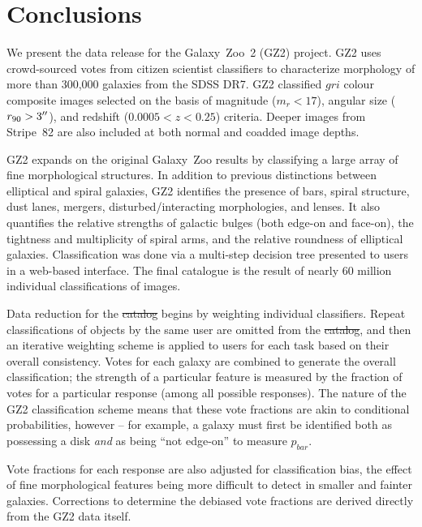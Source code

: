 \documentclass[useAMS,usenatbib]{mn2e}
\providecommand{\DIFaddtex}[1]{{\protect\color{blue}\uwave{#1}}} %
\providecommand{\DIFdeltex}[1]{{\protect\color{red}\sout{#1}}}                      %
\providecommand{\DIFaddbegin}{} %
\providecommand{\DIFaddend}{} %
\providecommand{\DIFdelbegin}{} %
\providecommand{\DIFdelend}{} %
\providecommand{\DIFadd}[1]{\texorpdfstring{\DIFaddtex{#1}}{#1}} %
\providecommand{\DIFdel}[1]{\texorpdfstring{\DIFdeltex{#1}}{}} %
\begin{document}

\section{Conclusions}\label{sec-conclusion}

We present the data release for the Galaxy~Zoo~2 (GZ2) project. GZ2 uses crowd-sourced votes from citizen scientist classifiers to characterize morphology of more than 300,000 galaxies from the SDSS DR7. GZ2 classified $gri$ colour composite images selected on the basis of magnitude ($m_r<17$), angular size ($r_{90}>3\hbox{$^{\prime\prime}$}$), and redshift ($0.0005<z<0.25$) criteria. Deeper images from Stripe~82 are also included at both normal and coadded image depths. 

GZ2 expands on the original Galaxy~Zoo results by classifying a large array of fine morphological structures. In addition to previous distinctions between elliptical and spiral galaxies, GZ2 identifies the presence of bars, spiral structure, dust lanes, mergers, disturbed/interacting morphologies, and lenses. It also quantifies the relative strengths of galactic bulges (both edge-on and face-on), the tightness and multiplicity of spiral arms, and the relative roundness of elliptical galaxies. Classification was done via a multi-step decision tree presented to users in a web-based interface. The final catalogue is the result of nearly 60 million individual classifications of images.

Data reduction for the \DIFdelbegin \DIFdel{catalog }\DIFdelend \DIFaddbegin \DIFadd{catalogue }\DIFaddend begins by weighting individual classifiers. Repeat classifications of objects by the same user are omitted from the \DIFdelbegin \DIFdel{catalog}\DIFdelend \DIFaddbegin \DIFadd{catalogue}\DIFaddend , and then an iterative weighting scheme is applied to users for each task based on their overall consistency. Votes for each galaxy are combined to generate the overall classification; the strength of a particular feature is measured by the fraction of votes for a particular response (among all possible responses). The nature of the GZ2 classification scheme means that these vote fractions are akin to conditional probabilities, however -- for example, a galaxy must first be identified both as possessing a disk {\em and} as being ``not edge-on'' to measure $p_{bar}$.

Vote fractions for each response are also adjusted for classification bias, the effect of fine morphological features being more difficult to detect in smaller and fainter galaxies. Corrections to determine the debiased vote fractions are derived directly from the GZ2 data itself. 
\end{document}
